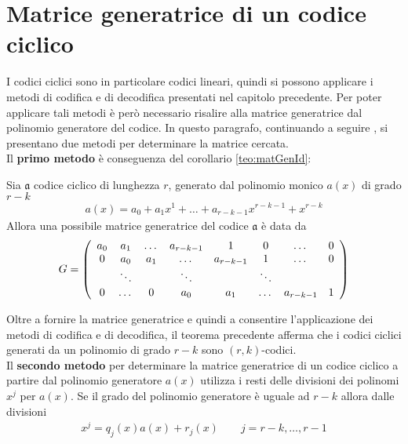 \section{Matrice generatrice di un codice ciclico}
I codici ciclici sono in particolare codici lineari, quindi si possono applicare i metodi di codifica e di decodifica presentati nel capitolo precedente. Per poter applicare tali metodi è però necessario risalire alla matrice generatrice dal polinomio generatore del codice. In questo paragrafo, continuando a seguire \cite{berardi}, si presentano due metodi per determinare la matrice cercata. \\
Il {\bf primo metodo} è conseguenza del corollario \ref{teo:matGenId}:
\begin{teorema}\label{teo:ciclicoPrimoMetodo}
   Sia $\mathfrak{a}$ codice ciclico di lunghezza $r$, generato dal polinomio monico $a(x)$ di grado $r-k$
   \begin{align*}
      a(x) = a_{0} + a_{1}x^{1} + \dots + a_{r-k-1}x^{r-k-1} + x^{r-k}
   \end{align*}
   Allora una possibile matrice generatrice del codice $\mathfrak{a}$ è data da
   \begin{align*}
      G = 
      \left(
      \begin{array} {c c c c c c c c}
      a_{0} & a_{1} & \dots & a_{r-k-1} & 1 & 0 & \dots & 0 \\
      0 & a_{0} & a_{1} & \dots & a_{r-k-1} & 1 & \dots & 0  \\
       & \ddots &  & \ddots &  & \ddots &  &     \\
      0 & \dots & 0 & a_{0} & a_{1} & \dots & a_{r-k-1} & 1      
      \end{array}
      \right)
   \end{align*}
\end{teorema}
Oltre a  fornire la matrice generatrice e quindi a consentire l'applicazione dei metodi di codifica e di decodifica, il teorema precedente afferma che i codici ciclici generati da un polinomio di grado $r-k$ sono $(r,k)$-codici.
\\
Il {\bf secondo metodo} per determinare la matrice generatrice di un codice ciclico a partire dal polinomio generatore $a(x)$ utilizza i resti delle divisioni dei polinomi $x^{j}$ per $a(x)$. Se il grado del polinomio generatore è uguale ad $r-k$ allora dalle divisioni
\begin{align*}
   x^{j} = q_{j}(x)a(x) + r_{j}(x) \qquad j = r-k , \dots , r-1  
\end{align*}
